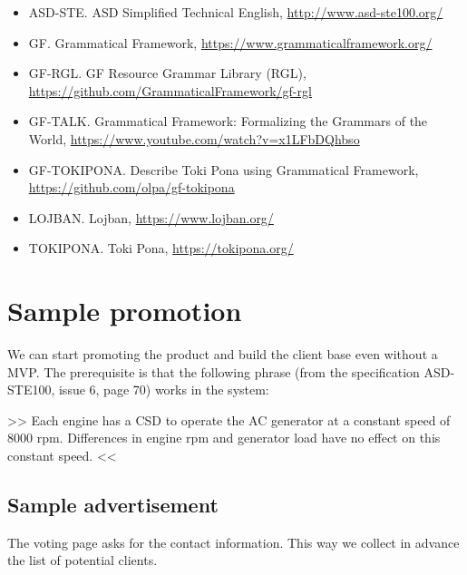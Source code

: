 \documentclass{article}
\begin{document}
\begin{itemize}
\item ASD-STE. ASD Simplified Technical English, \url{http://www.asd-ste100.org/}
\item GF. Grammatical Framework, \url{https://www.grammaticalframework.org/}
\item GF-RGL. GF Resource Grammar Library (RGL), \url{https://github.com/GrammaticalFramework/gf-rgl}
\item GF-TALK. Grammatical Framework: Formalizing the Grammars of the World, \url{https://www.youtube.com/watch?v=x1LFbDQhbso}
\item GF-TOKIPONA. Describe Toki Pona using Grammatical Framework, \url{https://github.com/olpa/gf-tokipona}
\item LOJBAN. Lojban, \url{https://www.lojban.org/}
\item TOKIPONA. Toki Pona, \url{https://tokipona.org/}
\end{itemize}


\section{Sample promotion}\label{promotion}

We can start promoting the product and build the client base even without a MVP. The prerequisite is that the following phrase (from the specification ASD-STE100, issue 6, page 70) works in the system:

>> Each engine has a CSD to operate the AC generator at a constant speed of 8000 rpm. Differences in engine rpm and generator load have no effect on this constant speed. <<

\subsection{Sample advertisement}


The voting page asks for the contact information. This way we collect in advance the list of potential clients.
\end{document}
